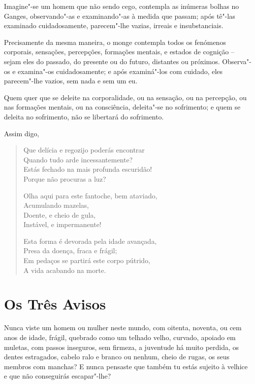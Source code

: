 Imagine"-se um homem que não sendo cego, contempla as inúmeras bolhas no Ganges,
observando"-as e examinando"-as à medida que passam; após tê"-las examinado
cuidadosamente, parecem"-lhe vazias, irreais e insubstanciais.

Precisamente da mesma maneira, o monge contempla todos os fenómenos corporais,
sensações, percepções, formações mentais, e estados de cognição -- sejam eles do
passado, do presente ou do futuro, distantes ou próximos. Observa"-os e
examina"-os cuidadosamente; e após examiná"-los com cuidado, eles parecem"-lhe
vazios, sem nada e sem um eu.


Quem quer que se deleite na corporalidade, ou na sensação, ou na percepção, ou
nas formações mentais, ou na consciência, deleita"-se no sofrimento; e quem se
deleita no sofrimento, não se libertará do sofrimento.


\clearpage

Assim digo,

\begin{verse}
Que delícia e regozijo poderás encontrar\\
Quando tudo arde incessantemente?\\
Estás fechado na mais profunda escuridão!\\
Porque não procuras a luz?

Olha aqui para este fantoche, bem ataviado,\\
Acumulando mazelas,\\
Doente, e cheio de gula,\\
Instável, e impermanente!

Esta forma é devorada pela idade avançada,\\
Presa da doença, fraca e frágil;\\
Em pedaços se partirá este corpo pútrido,\\
A vida acabando na morte.
\end{verse}


\section{Os Três Avisos}

Nunca viste um homem ou mulher neste mundo, com oitenta, noventa, ou cem anos de
idade, frágil, quebrado como um telhado velho, curvado, apoiado em muletas, com
passos inseguros, sem firmeza, a juventude há muito perdida, os dentes
estragados, cabelo ralo e branco ou nenhum, cheio de rugas, os seus membros com
manchas? E nunca pensaste que também tu estás sujeito à velhice e que não
conseguirás escapar"-lhe?

